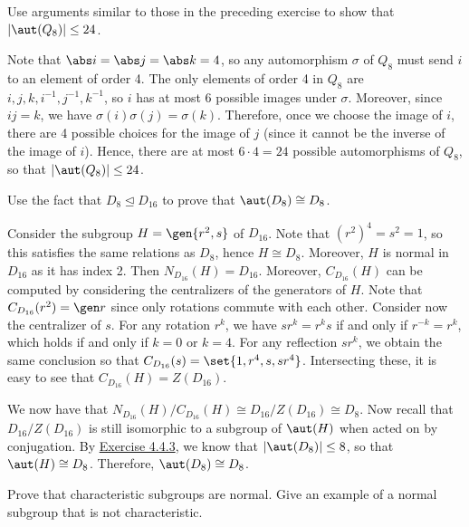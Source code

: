 \begin{exercise}
	Use arguments similar to those in the preceding exercise to show that $|\aut(Q_8)| \le 24$.
\end{exercise}

\begin{sol}
	Note that $\abs i = \abs j = \abs k = 4$, so any automorphism $\sigma$ of $Q_8$ must send $i$ to an element of order 4. The only elements of order 4 in $Q_8$ are $i, j, k, i^{-1}, j^{-1}, k^{-1}$, so $i$ has at most 6 possible images under $\sigma$. Moreover, since $ij = k$, we have $\sigma(i)\sigma(j) = \sigma(k)$. Therefore, once we choose the image of $i$, there are 4 possible choices for the image of $j$ (since it cannot be the inverse of the image of $i$). Hence, there are at most $6 \cdot 4 = 24$ possible automorphisms of $Q_8$, so that $|\aut(Q_8)| \leq 24$.
\end{sol}

\begin{exercise}
	Use the fact that $D_8 \trianglelefteq D_{16}$ to prove that $\aut(D_8) \cong D_8$.
\end{exercise}

\begin{sol}
	Consider the subgroup $H = \gen{r^2, s}$ of $D_{16}$. Note that $(r^2)^4 = s^2 = 1$, so this satisfies the same relations as $D_8$, hence $H \cong D_8$. Moreover, $H$ is normal in $D_{16}$ as it has index 2. Then $N_{D_{16}}(H) = D_{16}$. Moreover, $C_{D_{16}}(H)$ can be computed by considering the centralizers of the generators of $H$. Note that $C_{D_{16}}(r^2) = \gen r$ since only rotations commute with each other. Consider now the centralizer of $s$. For any rotation $r^k$, we have $sr^k = r^ks$ if and only if $r^{-k} = r^k$, which holds if and only if $k = 0$ or $k = 4$. For any reflection $sr^k$, we obtain the same conclusion so that $C_{D_{16}}(s) = \set{1, r^4, s, sr^4}$. Intersecting these, it is easy to see that $C_{D_{16}}(H) = Z(D_{16})$.

	We now have that $N_{D_{16}}(H)/C_{D_{16}}(H) \cong D_{16}/Z(D_{16}) \cong D_8$. Now recall that $D_{16}/Z(D_{16})$ is still isomorphic to a subgroup of $\aut(H)$ when acted on by conjugation. By \hyperref[ex4.4.3]{Exercise 4.4.3}, we know that $|\aut(D_8)| \leq 8$, so that $\aut(H) \cong D_8$. Therefore, $\aut(D_8) \cong D_8$.
\end{sol}

\begin{exercise}
	Prove that characteristic subgroups are normal. Give an example of a normal subgroup that is not characteristic.
\end{exercise}

